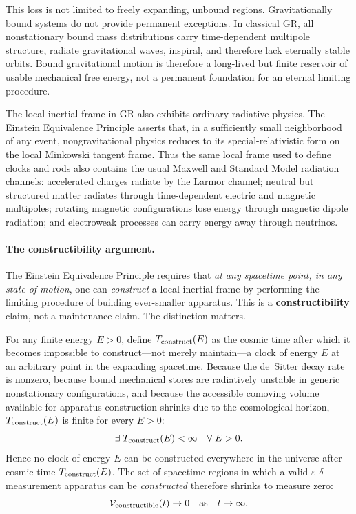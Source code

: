 \documentclass[11pt,a4paper]{article}
\begin{document}
This loss is not limited to freely expanding, unbound regions. Gravitationally bound systems do not provide permanent exceptions. In classical GR, all nonstationary bound mass distributions carry time-dependent multipole structure, radiate gravitational waves, inspiral, and therefore lack eternally stable orbits. Bound gravitational motion is therefore a long-lived but finite reservoir of usable mechanical free energy, not a permanent foundation for an eternal limiting procedure.

The local inertial frame in GR also exhibits ordinary radiative physics. The Einstein Equivalence Principle asserts that, in a sufficiently small neighborhood of any event, nongravitational physics reduces to its special-relativistic form on the local Minkowski tangent frame. Thus the same local frame used to define clocks and rods also contains the usual Maxwell and Standard Model radiation channels: accelerated charges radiate by the Larmor channel; neutral but structured matter radiates through time-dependent electric and magnetic multipoles; rotating magnetic configurations lose energy through magnetic dipole radiation; and electroweak processes can carry energy away through neutrinos.

\paragraph{The constructibility argument.}

The Einstein Equivalence Principle requires that \emph{at any spacetime point, in any state of motion}, one can \emph{construct} a local inertial frame by performing the limiting procedure of building ever-smaller apparatus. This is a \textbf{constructibility} claim, not a maintenance claim. The distinction matters.

For any finite energy $E > 0$, define $T_{\rm construct}(E)$ as the cosmic time after which it becomes impossible to construct---not merely maintain---a clock of energy $E$ at an arbitrary point in the expanding spacetime. Because the de~Sitter decay rate is nonzero, because bound mechanical stores are radiatively unstable in generic nonstationary configurations, and because the accessible comoving volume available for apparatus construction shrinks due to the cosmological horizon, $T_{\rm construct}(E)$ is finite for every $E > 0$:
\[
\exists\; T_{\rm construct}(E) < \infty \quad \forall\; E > 0.
\]
Hence no clock of energy $E$ can be constructed everywhere in the universe after cosmic time $T_{\rm construct}(E)$. The set of spacetime regions in which a valid $\varepsilon$-$\delta$ measurement apparatus can be \emph{constructed} therefore shrinks to measure zero:
\[
\mathcal{V}_{\rm constructible}(t) \to 0 \quad \text{as} \quad t \to \infty.
\]
\end{document}
